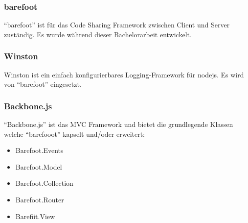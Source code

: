\subsubsection*{barefoot}
``barefoot'' \cite{Barefoot} ist für das Code Sharing Framework zwischen Client und Server zuständig. Es wurde während dieser Bachelorarbeit entwickelt.

\subsubsection*{Winston}
Winston \cite{Winston} ist ein einfach konfigurierbares Logging-Framework für \gls{nodejs}. Es wird von ``barefoot'' eingesetzt.

\subsubsection*{Backbone.js}
``Backbone.js'' \cite{Backbonejs} ist das MVC Framework und bietet die grundlegende Klassen welche ``barefooot'' kapselt und/oder erweitert:

\begin{itemize}
	\item Barefoot.Events
	\item Barefoot.Model
	\item Barefoot.Collection
	\item Barefoot.Router
	\item Barefiit.View
\end{itemize}